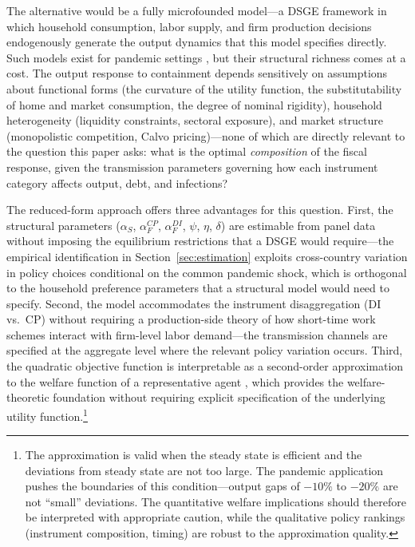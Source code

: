 \documentclass[12pt, a4paper]{article}
\begin{document}
The alternative would be a fully microfounded model---a DSGE framework in which household consumption, labor supply, and firm production decisions endogenously generate the output dynamics that this model specifies directly. Such models exist for pandemic settings \citep{eichenbaum2021, kaplan2020}, but their structural richness comes at a cost. The output response to containment depends sensitively on assumptions about functional forms (the curvature of the utility function, the substitutability of home and market consumption, the degree of nominal rigidity), household heterogeneity (liquidity constraints, sectoral exposure), and market structure (monopolistic competition, Calvo pricing)---none of which are directly relevant to the question this paper asks: what is the optimal \textit{composition} of the fiscal response, given the transmission parameters governing how each instrument category affects output, debt, and infections?

The reduced-form approach offers three advantages for this question. First, the structural parameters ($\alpha_S$, $\alpha_F^{CP}$, $\alpha_F^{DI}$, $\psi$, $\eta$, $\delta$) are estimable from panel data without imposing the equilibrium restrictions that a DSGE would require---the empirical identification in Section~\ref{sec:estimation} exploits cross-country variation in policy choices conditional on the common pandemic shock, which is orthogonal to the household preference parameters that a structural model would need to specify. Second, the model accommodates the instrument disaggregation (DI vs.\ CP) without requiring a production-side theory of how short-time work schemes interact with firm-level labor demand---the transmission channels are specified at the aggregate level where the relevant policy variation occurs. Third, the quadratic objective function is interpretable as a second-order approximation to the welfare function of a representative agent \citep{woodford2003}, which provides the welfare-theoretic foundation without requiring explicit specification of the underlying utility function.\footnote{The approximation is valid when the steady state is efficient and the deviations from steady state are not too large. The pandemic application pushes the boundaries of this condition---output gaps of $-10\%$ to $-20\%$ are not ``small'' deviations. The quantitative welfare implications should therefore be interpreted with appropriate caution, while the qualitative policy rankings (instrument composition, timing) are robust to the approximation quality.}
\end{document}
